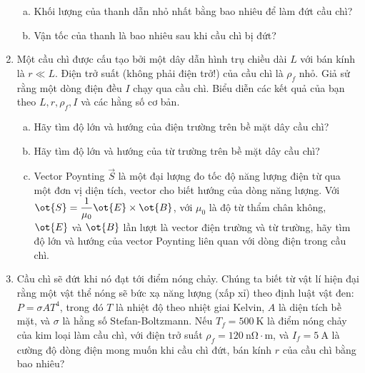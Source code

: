 \begin{vd}
\begin{enumerate}[1.]
\begin{center}
\begin{tikzpicture}[x=0.75pt,y=0.75pt,yscale=-1,xscale=1]
\end{tikzpicture}

    \end{center}
    \begin{enumerate}[a)]
        \item Khối lượng của thanh dẫn nhỏ nhất bằng bao nhiêu để làm đứt cầu chì?
        \item Vận tốc của thanh là bao nhiêu sau khi cầu chì bị đứt?
    \end{enumerate}
    \item Một cầu chì được cấu tạo bởi một dây dẫn hình trụ chiều dài $L$ với bán kính là $r\ll L$. Điện trở suất (không phải điện trở!) của cầu chì là $\rho_f$ nhỏ. Giả sử rằng một dòng điện đều $I$ chạy qua cầu chì. Biểu diễn các kết quả của bạn theo $L, r, \rho_f, I$ và các hằng số cơ bản.
    \begin{enumerate}[a)]
        \item Hãy tìm độ lớn và hướng của điện trường trên bề mặt dây cầu chì?
        \item Hãy tìm độ lớn và hướng của từ trường trên bề mặt dây cầu chì?
        \item Vector Poynting $\overrightarrow{S}$ là một đại lượng đo tốc độ năng lượng điện từ qua một đơn vị diện tích, vector cho biết hướng của dòng năng lượng. Với $\ot{S}=\dfrac{1}{\mu_0}\ot{E}\times\ot{B}$, với $\mu_0$ là độ từ thẩm chân không, $\ot{E}$ và $\ot{B}$ lần lượt là vector điện trường và từ trường, hãy tìm độ lớn và hướng của vector Poynting liên quan với dòng điện trong cầu chì.
    \end{enumerate}
    \item Cầu chì sẽ đứt khi nó đạt tới điểm nóng chảy. Chúng ta biết từ vật lí hiện đại rằng một vật thể nóng sẽ bức xạ năng lượng (xấp xỉ) theo định luật vật đen: $P=\sigma A T^4$, trong đó $T$ là nhiệt độ theo nhiệt giai Kelvin, $A$ là diện tích bề mặt, và $\sigma$ là hằng số Stefan-Boltzmann. Nếu $T_f=500\ \mathrm{K}$ là điểm nóng chảy của kim loại làm cầu chì, với điện trở suất $\rho_f=120\ \mathrm{n\Omega\cdot m}$, và $I_f=5\ \mathrm{A}$ là cường độ dòng điện mong muốn khi cầu chì đứt, bán kính $r$ của cầu chì bằng bao nhiêu?
    \end{enumerate}
\end{vd}

